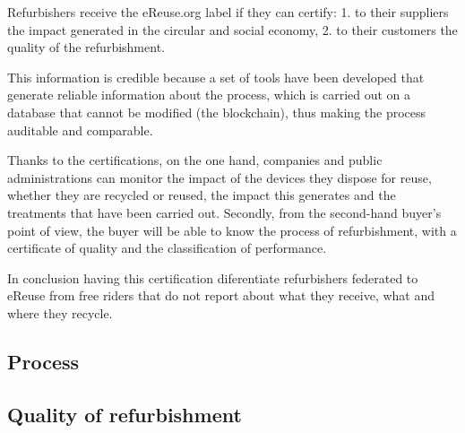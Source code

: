 \documentclass[
]{book}
\begin{document}
Refurbishers receive the eReuse.org label if they can certify:
1. to their suppliers the impact generated in the circular and social economy,
2. to their customers the quality of the refurbishment.

This information is credible because a set of tools have been developed that generate reliable information about the process, which is carried out on a database that cannot be modified (the blockchain), thus making the process auditable and comparable.

Thanks to the certifications, on the one hand, companies and public administrations can monitor the impact of the devices they dispose for reuse, whether they are recycled or reused, the impact this generates and the treatments that have been carried out. Secondly, from the second-hand buyer's point of view, the buyer will be able to know the process of refurbishment, with a certificate of quality and the classification of performance.

In conclusion having this certification diferentiate refurbishers federated to eReuse from free riders that do not report about what they receive, what and where they recycle.

\hypertarget{process}{%
\subsection{Process}\label{process}}

\hypertarget{quality-of-refurbishment}{%
\subsection{Quality of refurbishment}\label{quality-of-refurbishment}}
\end{document}
